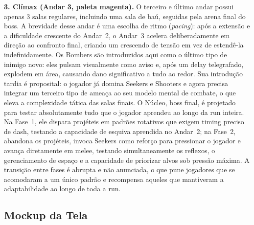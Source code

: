 \documentclass[12pt, a4paper]{article}
\begin{document}
\textbf{3. Cl\'imax (Andar 3, paleta magenta).} O terceiro e \'ultimo andar possui apenas 3 salas regulares, incluindo uma sala de ba\'u, seguidas pela arena final do boss. A brevidade desse andar \'e uma escolha de ritmo (\textit{pacing}): ap\'os a extens\~ao e a dificuldade crescente do Andar~2, o Andar~3 acelera deliberadamente em dire\c{c}\~ao ao confronto final, criando um crescendo de tens\~ao em vez de estend\^e-la indefinidamente. Os Bombers s\~ao introduzidos aqui como o \'ultimo tipo de inimigo novo: eles pulsam visualmente como aviso e, ap\'os um delay telegrafado, explodem em \'area, causando dano significativo a tudo ao redor. Sua introdu\c{c}\~ao tardia \'e proposital: o jogador j\'a domina Seekers e Shooters e agora precisa integrar um terceiro tipo de amea\c{c}a ao seu modelo mental de combate, o que eleva a complexidade t\'atica das salas finais. O N\'ucleo, boss final, \'e projetado para testar absolutamente tudo que o jogador aprendeu ao longo da run inteira. Na Fase~1, ele dispara proj\'eteis em padr\~oes rotativos que exigem timing preciso de dash, testando a capacidade de esquiva aprendida no Andar~2; na Fase~2, abandona os proj\'eteis, invoca Seekers como refor\c{c}o para pressionar o jogador e avan\c{c}a diretamente em melee, testando simultaneamente os reflexos, o gerenciamento de espa\c{c}o e a capacidade de priorizar alvos sob press\~ao m\'axima. A transi\c{c}\~ao entre fases \'e abrupta e n\~ao anunciada, o que pune jogadores que se acomodaram a um \'unico padr\~ao e recompensa aqueles que mantiveram a adaptabilidade ao longo de toda a run.

\subsection{Mockup da Tela}
\end{document}
